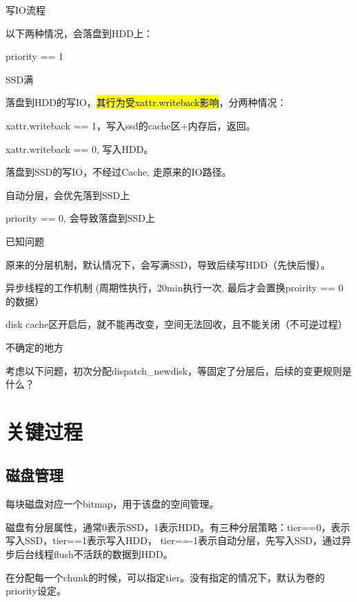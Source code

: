 写IO流程

以下两种情况，会落盘到HDD上：
\begin{compactenum}
\item priority == 1
\item SSD满
\end{compactenum}

落盘到HDD的写IO，\hl{其行为受xattr.writeback影响}，分两种情况：
\begin{compactenum}
\item xattr.writeback == 1，写入ssd的cache区+内存后，返回。
\item xattr.writeback == 0, 写入HDD。
\end{compactenum}

落盘到SSD的写IO，不经过Cache, 走原来的IO路径。
\begin{compactenum}
\item 自动分层，会优先落到SSD上
\item priority == 0, 会导致落盘到SSD上
\end{compactenum}

已知问题

\begin{compactenum}
\item 原来的分层机制，默认情况下，会写满SSD，导致后续写HDD（先快后慢）。
\item 异步线程的工作机制 (周期性执行，20min执行一次, 最后才会置换proirity == 0的数据）
\item disk cache区开启后，就不能再改变，空间无法回收，且不能关闭（不可逆过程）
\end{compactenum}

不确定的地方

考虑以下问题，初次分配dispatch\_newdisk，等固定了分层后，后续的变更规则是什么？

\section{关键过程}

\subsection{磁盘管理}

每块磁盘对应一个bitmap，用于该盘的空间管理。

磁盘有分层属性，通常0表示SSD，1表示HDD。有三种分层策略：tier==0，表示写入SSD，tier==1表示写入HDD，
tier==-1表示自动分层，先写入SSD，通过异步后台线程flush不活跃的数据到HDD。

在分配每一个chunk的时候，可以指定tier。没有指定的情况下，默认为卷的priority设定。

